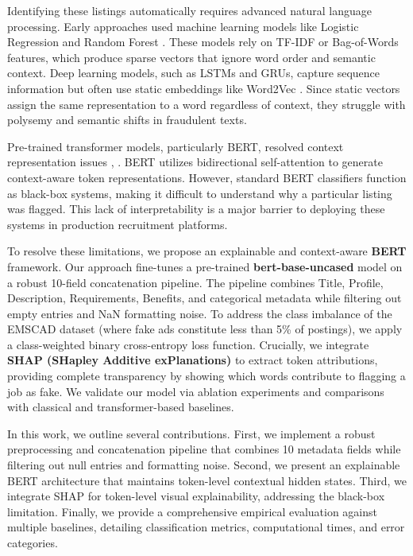 \documentclass[conference]{IEEEtran}
\begin{document}
Identifying these listings automatically requires advanced natural language processing. Early approaches used machine learning models like Logistic Regression and Random Forest \cite{chiraratanasopha2022detecting}. These models rely on TF-IDF or Bag-of-Words features, which produce sparse vectors that ignore word order and semantic context. Deep learning models, such as LSTMs and GRUs, capture sequence information but often use static embeddings like Word2Vec \cite{pillai2023detecting}. Since static vectors assign the same representation to a word regardless of context, they struggle with polysemy and semantic shifts in fraudulent texts.

Pre-trained transformer models, particularly BERT, resolved context representation issues \cite{sanisetty2025comprehensive}, \cite{srilakshmi2026transformer}. BERT utilizes bidirectional self-attention to generate context-aware token representations. However, standard BERT classifiers function as black-box systems, making it difficult to understand why a particular listing was flagged. This lack of interpretability is a major barrier to deploying these systems in production recruitment platforms.

To resolve these limitations, we propose an explainable and context-aware \textbf{BERT} framework. Our approach fine-tunes a pre-trained \textbf{bert-base-uncased} model on a robust 10-field concatenation pipeline. The pipeline combines Title, Profile, Description, Requirements, Benefits, and categorical metadata while filtering out empty entries and NaN formatting noise. To address the class imbalance of the EMSCAD dataset (where fake ads constitute less than 5\% of postings), we apply a class-weighted binary cross-entropy loss function. Crucially, we integrate \textbf{SHAP (SHapley Additive exPlanations)} to extract token attributions, providing complete transparency by showing which words contribute to flagging a job as fake. We validate our model via ablation experiments and comparisons with classical and transformer-based baselines.

In this work, we outline several contributions. First, we implement a robust preprocessing and concatenation pipeline that combines 10 metadata fields while filtering out null entries and formatting noise. Second, we present an explainable BERT architecture that maintains token-level contextual hidden states. Third, we integrate SHAP for token-level visual explainability, addressing the black-box limitation. Finally, we provide a comprehensive empirical evaluation against multiple baselines, detailing classification metrics, computational times, and error categories.
\end{document}
